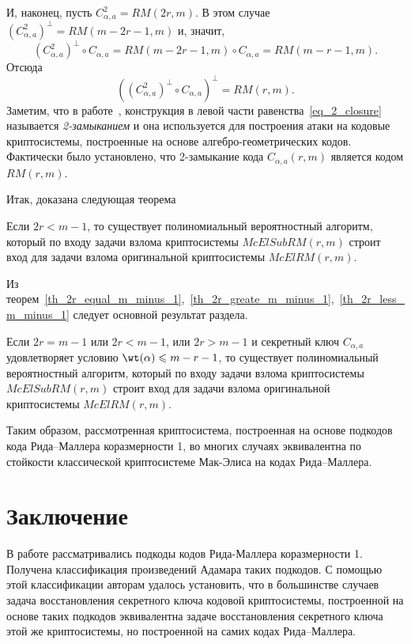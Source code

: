 И, наконец, пусть \(C^2_{\alpha,a}=RM(2r,m)\).
В этом случае \((C^2_{\alpha,a})^{\perp}=RM(m-2r-1, m)\) и, значит,
\[
	(C^2_{\alpha,a})^{\perp} \circ C_{\alpha, a} = RM(m-2r-1,m)\circ C_{\alpha, a} = RM(m-r-1, m).
\]
Отсюда
\begin{equation}
	\label{eq_2_closure}
	\left((C^2_{\alpha,a})^{\perp} \circ C_{\alpha, a}\right)^{\perp} = RM(r,m).

\end{equation}
Заметим, что в работе~\cite{couvreur2015cryptanalysis}, конструкция в левой части равенства~\ref{eq_2_closure} называется \emph{2-замыканием} и она используется для построения атаки на кодовые криптосистемы, построенные на основе алгебро-геометрических кодов.
Фактически было установлено, что 2-замыкание кода \(C_{\alpha, a}(r,m)\) является кодом \(RM(r,m)\).

Итак, доказана следующая теорема

\begin{theorem}
	\label{th_2r_less_m_minus_1}
	Если \(2r<m-1\), то существует полиномиальный вероятностный алгоритм, который по входу задачи взлома криптосистемы \(McElSubRM(r,m)\) строит вход для задачи взлома оригинальной криптосистемы \(McElRM(r,m)\).
\end{theorem}

Из теорем~\ref{th_2r_equal_m_minus_1},~\ref{th_2r_greate_m_minus_1},~\ref{th_2r_less_m_minus_1} следует основной результат раздела.

\begin{theorem}
	\label{th_any_param}
	Если \(2r=m-1\) или \(2r<m-1\), или \(2r>m-1\) и секретный ключ \(C_{\alpha, a}\) удовлетворяет условию \(\wt(\alpha)\leqslant m - r - 1\), то существует полиномиальный вероятностный алгоритм, который по входу задачи взлома криптосистемы \(McElSubRM(r,m)\) строит вход для задачи взлома оригинальной криптосистемы \(McElRM(r,m)\).
\end{theorem}

Таким образом, рассмотренная криптосистема, построенная на основе подкодов кода Рида--Маллера коразмерности 1, во многих случаях эквивалентна по стойкости классической криптосистеме Мак-Элиса на кодах Рида--Маллера.

\section{Заключение}
В работе рассматривались подкоды кодов Рида-Маллера коразмерности 1.
Получена классификация произведений Адамара таких подкодов.
С помощью этой классификации авторам удалось установить, что в большинстве случаев задача восстановления секретного ключа кодовой криптосистемы, построенной на основе таких подкодов эквивалентна задаче восстановления секретного ключа этой же криптосистемы, но построенной на самих кодах Рида--Маллера.

